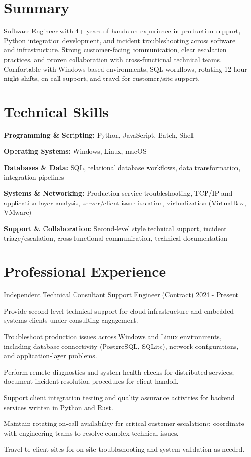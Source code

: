 \documentclass{../styles/resume}
\begin{document}
\populatedtitle

\section{Summary}
    Software Engineer with 4+ years of hands-on experience in production support, Python integration development, and incident troubleshooting across software and infrastructure. Strong customer-facing communication, clear escalation practices, and proven collaboration with cross-functional technical teams. Comfortable with Windows-based environments, SQL workflows, rotating 12-hour night shifts, on-call support, and travel for customer/site support.

\section{Technical Skills}
\resumesublistbegin
    \item \textbf{Programming \& Scripting:} Python, JavaScript, Batch, Shell
    \item \textbf{Operating Systems:} Windows, Linux, macOS
    \item \textbf{Databases \& Data:} SQL, relational database workflows, data transformation, integration pipelines
    \item \textbf{Systems \& Networking:} Production service troubleshooting, TCP/IP and application-layer analysis, server/client issue isolation, virtualization (VirtualBox, VMware)
    \item \textbf{Support \& Collaboration:} Second-level style technical support, incident triage/escalation, cross-functional communication, technical documentation
\resumesublistend

\section{Professional Experience}

\subsectionpositiondate
    {Independent Technical Consultant}
    {Support Engineer (Contract)}
    {2024 - Present}
\resumesublistbegin
    \item Provide second-level technical support for cloud infrastructure and embedded systems clients under consulting engagement.
    \item Troubleshoot production issues across Windows and Linux environments, including database connectivity (PostgreSQL, SQLite), network configurations, and application-layer problems.
    \item Perform remote diagnostics and system health checks for distributed services; document incident resolution procedures for client handoff.
    \item Support client integration testing and quality assurance activities for backend services written in Python and Rust.
    \item Maintain rotating on-call availability for critical customer escalations; coordinate with engineering teams to resolve complex technical issues.
    \item Travel to client sites for on-site troubleshooting and system validation as needed.
\resumesublistend
\end{document}
